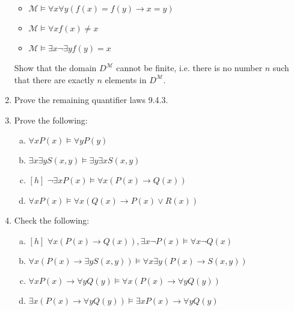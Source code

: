 \begin{enumerate}[\thesection.1]
\begin{itemize}
			\item $\mathcal{M}\vDash \forall x\forall y(f(x)=f(y)\to x=y)$
			
			\item $\mathcal{M}\vDash \forall xf(x)\neq x$
			
			\item $\mathcal{M}\vDash\exists x\neg\exists yf(y)=x$
		
		\end{itemize}

		Show that the domain $D^\mathcal{M}$ cannot be finite, i.e. there is no number $n$ such that there are exactly $n$ elements in $D^\mathcal{M}$.
		
		\item Prove the remaining quantifier laws 9.4.3.
		
		\item Prove the following:
		
		\begin{enumerate}[(a)]
		
		\item $\forall xP(x)\vDash \forall yP(y)$

		\item $\exists x\exists yS(x,y)\vDash \exists y\exists xS(x,y)$

		\item $[h]$ $\neg \exists xP(x)\vDash \forall x(P(x)\to Q(x))$

		\item $\forall xP(x)\vDash \forall x(Q(x)\to P(x)\lor R(x))$

		\end{enumerate}
		
		\item Check the following:
		
		\begin{enumerate}[(a)]

			\item $[h]$ $\forall x(P(x)\to Q(x)), \exists x\neg P(x)\vDash \forall x\neg Q(x)$

			\item $\forall x(P(x)\to \exists yS(x,y))\vDash \forall x\exists y(P(x)\to S(x,y))$

			\item $\forall xP(x)\to \forall yQ(y)\vDash \forall x(P(x)\to \forall yQ(y))$

			\item $\exists x(P(x)\to \forall yQ(y))\vDash \exists xP(x)\to \forall yQ(y)$


\end{enumerate}
\end{enumerate}
